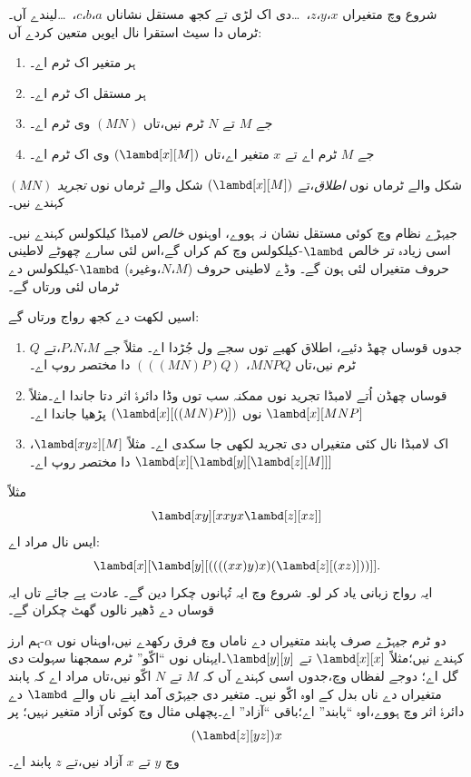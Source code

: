 \documentclass[../../../include/open-logic-section]{subfiles}
\begin{document}

شروع وچ متغیراں $x$،$y$،$z$،~\dots دی اک لڑی تے کجھ مستقل
نشاناں $a$،$b$،$c$،~\dots لیندے آں۔ ٹرماں دا سیٹ استقرا نال ایویں متعین کردے آں:
\begin{enumerate}
\item ہر متغیر اک ٹرم اے۔
\item ہر مستقل اک ٹرم اے۔
\item جے $M$ تے $N$ ٹرم نیں،تاں $(MN)$ وی ٹرم اے۔
\item جے $M$ ٹرم اے تے $x$ متغیر اے،تاں $(\lambd[x][M])$ وی اک
  ٹرم اے۔
\end{enumerate}
$(MN)$ شکل والے ٹرماں نوں \emph{اطلاق}،تے
$(\lambd[x][M])$ شکل والے ٹرماں نوں \emph{تجرید} کہندے نیں۔

جیہڑے نظام وچ کوئی مستقل نشان نہ ہووے، اوہنوں \emph{خالص}
لامبڈا کیلکولس کہندے نیں۔اسی زیادہ تر خالص $\lambd$-کیلکولس
وچ کم کراں گے،اس لئی سارے چھوٹے لاطینی حروف متغیراں لئی ہون گے۔
وڈے لاطینی حروف ($M$،$N$،وغیرہ) $\lambd$-کیلکولس دے ٹرماں
لئی ورتاں گے۔

اسیں لکھت دے کجھ رواج ورتاں گے:

\begin{conv}
\begin{enumerate}
\item جدوں قوساں چھڈ دئیے، اطلاق کھبے توں سجے ول جُڑدا اے۔
  مثلاً جے $M$،$N$،$P$،تے $Q$ ٹرم نیں،تاں $MNPQ$،
  $(((MN)P)Q)$ دا مختصر روپ اے۔
\item قوساں چھڈن اُتے لامبڈا تجرید نوں ممکنہ سب توں وڈا دائرۂ
  اثر دتا جاندا اے۔مثلاً $\lambd[x][MNP]$ نوں
  $(\lambd[x][((MN)P)])$ پڑھیا جاندا اے۔
\item اک لامبڈا نال کئی متغیراں دی تجرید لکھی جا سکدی اے۔
  مثلاً $\lambd[xyz][M]$،
  $\lambd[x][\lambd[y][\lambd[z][M]]]$ دا مختصر روپ اے۔
\end{enumerate}
\end{conv}

مثلاً
\[
\lambd[xy][xxyx \lambd[z][xz]]
\]
ایس نال مراد اے:
\[
\lambd[x][\lambd[y][((((xx)y)x)(\lambd[z][(xz)]))]].
\]
ایہ رواج زبانی یاد کر لو۔ شروع وچ ایہ تُہانوں چکرا دین گے۔ عادت
پے جائے تاں ایہ قوساں دے ڈھیر نالوں گھٹ چکران گے۔

دو ٹرم جیہڑے صرف پابند متغیراں دے ناماں وچ فرق رکھدے نیں،اوہناں
نوں $\alpha$-ہم ارز کہندے نیں؛مثلاً $\lambd[x][x]$ تے
$\lambd[y][y]$۔ایہناں نوں ``اکّو'' ٹرم سمجھنا سہولت دی گل اے؛
دوجے لفظاں وچ،جدوں اسی کہندے آں کہ $M$ تے $N$ اکّو نیں،تاں
مراد اے کہ پابند متغیراں دے ناں بدل کے اوہ اکّو نیں۔ متغیر دی
جیہڑی آمد اپنے ناں والے $\lambd$ دے دائرۂ اثر وچ ہووے،اوہ
``پابند'' اے؛باقی ``آزاد'' اے۔پچھلی مثال وچ کوئی آزاد متغیر نہیں؛
پر
\[
(\lambd[z][yz])x
\]
وچ $y$ تے $x$ آزاد نیں،تے $z$ پابند اے۔
\end{document}
